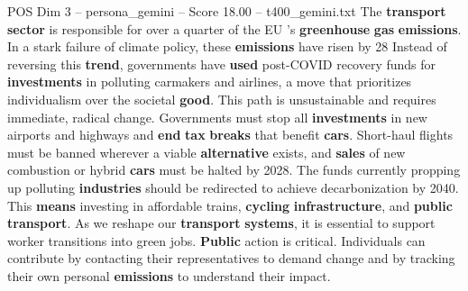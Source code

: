 \begin{textsample}{POS Dim 3 – persona\_gemini – Score 18.00 – t400\_gemini.txt}  \label{ex:f3_pos_045}
The \textbf{transport} \textbf{sector} is responsible for over a quarter of the EU 's \textbf{greenhouse} \textbf{gas} \textbf{emissions}.
In a stark failure of climate policy, these \textbf{emissions} have risen by 28 %
Instead of reversing this \textbf{trend}, governments have \textbf{used} post-COVID recovery funds for \textbf{investments} in polluting carmakers and airlines, a move that prioritizes individualism over the societal \textbf{good}.
This path is unsustainable and requires immediate, radical change.
Governments must stop all \textbf{investments} in new airports and highways and \textbf{end} \textbf{tax} \textbf{breaks} that benefit \textbf{cars}.
Short-haul flights must be banned wherever a viable \textbf{alternative} exists, and \textbf{sales} of new combustion or hybrid \textbf{cars} must be halted by 2028.
The funds currently propping up polluting \textbf{industries} should be redirected to achieve decarbonization by 2040.
This \textbf{means} investing in affordable trains, \textbf{cycling} \textbf{infrastructure}, and \textbf{public} \textbf{transport}.
As we reshape our \textbf{transport} \textbf{systems}, it is essential to support worker transitions into green jobs. \textbf{Public} action is critical.
Individuals can contribute by contacting their representatives to demand change and by tracking their own personal \textbf{emissions} to understand their impact.

\end{textsample}
